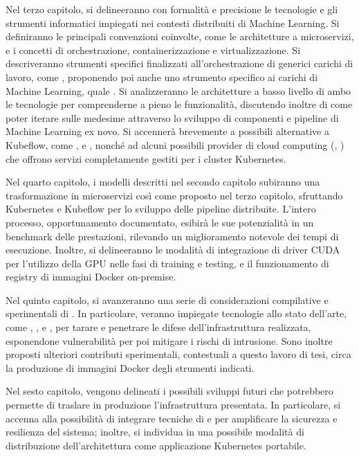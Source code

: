 Nel terzo capitolo, si delineeranno con formalità e precisione le tecnologie e gli strumenti informatici impiegati nei contesti distribuiti di Machine Learning. Si definiranno le principali convenzioni coinvolte, come le architetture a microservizi, e i concetti di orchestrazione, containerizzazione e virtualizzazione. Si descriveranno strumenti specifici finalizzati all'orchestrazione di generici carichi di lavoro, come , proponendo poi anche uno strumento specifico ai carichi di Machine Learning, quale . Si analizzeranno le architetture a basso livello di ambo le tecnologie per comprenderne a pieno le funzionalità, discutendo inoltre di come poter iterare sulle medesime attraverso lo sviluppo di componenti e pipeline di Machine Learning ex novo. Si accennerà brevemente a possibili alternative a Kubeflow, come ,  e , nonché ad alcuni possibili provider di cloud computing (, ) che offrono servizi completamente gestiti per i cluster Kubernetes.

Nel quarto capitolo, i modelli descritti nel secondo capitolo subiranno una trasformazione in microservizi così come proposto nel terzo capitolo, sfruttando Kubernetes e Kubeflow per lo sviluppo delle pipeline distribuite. L'intero processo, opportunamento documentato, esibirà le sue potenzialità in un benchmark delle prestazioni, rilevando un miglioramento notevole dei tempi di esecuzione. Inoltre, si delineeranno le modalità di integrazione di driver CUDA per l'utilizzo della GPU nelle fasi di training e testing, e il funzionamento di registry di immagini Docker on-premise.

Nel quinto capitolo, si avanzeranno una serie di considerazioni compilative e sperimentali di . In particolare, veranno impiegate tecnologie allo stato dell'arte, come , ,  e , per tarare e penetrare le difese dell'infrastruttura realizzata, esponendone vulnerabilità per poi mitigare i rischi di intrusione. Sono inoltre proposti ulteriori contributi sperimentali, contestuali a questo lavoro di tesi, circa la produzione di immagini Docker degli strumenti indicati. 

Nel sesto capitolo, vengono delineati i possibili sviluppi futuri che potrebbero permette di traslare in produzione l'infrastruttura presentata. In particolare, si accenna alla possibilità di integrare tecniche di  e  per amplificare la sicurezza e resilienza del sistema; inoltre, si individua in  una possibile modalità di distribuzione dell'architettura come applicazione Kubernetes portabile.


